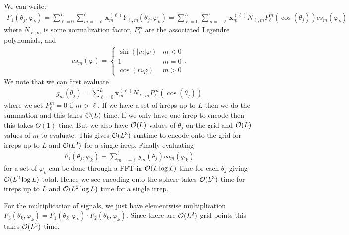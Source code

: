 We can write:
\begin{align}
F_1(\theta_{j},\varphi_{k})=\sum_{\ell=0}^L\sum_{m=-\ell}^\ell \mathbf{x}^{(\ell)}_m Y_{\ell,m}(\theta_j,\varphi_k)=\sum_{\ell=0}^L\sum_{m=-\ell}^\ell \mathbf{x}^{(\ell)}_m N_{\ell,m}P^{m}_\ell(\cos(\theta_j))cs_m(\varphi_k)
\end{align}
where $N_{\ell,m}$ is some normalization factor, $P_\ell^m$ are the associated Legendre polynomials, and
\begin{align}
    cs_m(\varphi)=\begin{cases}
    \sin(|m|\varphi) & m<0\\
    1 & m=0\\
    \cos(m\varphi) & m>0
\end{cases}.
\end{align}
We note that we can first evaluate
\begin{align}
   g_{m}(\theta_j)=\sum_{\ell=0}^L\mathbf{x}^{(\ell)}_m N_{\ell,m}P^{m}_\ell(\cos(\theta_j))
\end{align}
where we set $P^m_\ell=0$ if $m>\ell$. If we have a set of irreps up to $L$ then we do the summation and this takes $\mathcal{O}(L)$ time. If we only have one irrep to encode then this takes $O(1)$ time. But we also have $\mathcal{O}(L)$ values of $\theta_j$ on the grid and $\mathcal{O}(L)$ values of $m$ to evaluate. This gives $\mathcal{O}(L^3)$ runtime to encode onto the grid for irreps up to $L$ and $\mathcal{O}(L^2)$ for a single irrep. Finally evaluating 
\begin{align}
F_1(\theta_j,\varphi_k)=\sum_{m=-\ell}^\ell g_m(\theta_j) cs_m(\varphi_k)
\end{align}
for a set of $\varphi_k$ can be done through a FFT in $\mathcal{O}(L\log L)$ time for each $\theta_j$ giving $\mathcal{O}(L^2\log L)$ total. Hence we see encoding onto the sphere takes $\mathcal{O}(L^3)$ time for irreps up to $L$ and $\mathcal{O}(L^2\log L)$ time for a single irrep.

For the multiplication of signals, we just have elementwise multiplication $F_3(\theta_k,\varphi_k)=F_1(\theta_k,\varphi_k)\cdot F_2(\theta_k,\varphi_k)$. Since there are $\mathcal{O}(L^2)$ grid points this takes $\mathcal{O}(L^2)$ time.


